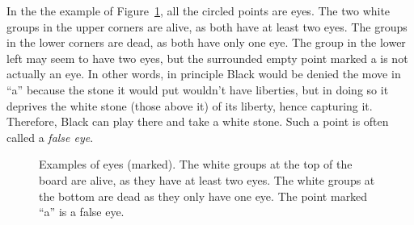 In the the example of Figure~\ref{LifeDeath}, all the circled points are eyes. The two white groups in the upper corners are alive, as both have at least two eyes. The groups in the lower corners are dead, as both have only one eye. The group in the lower left may seem to have two eyes, but the surrounded empty point marked a is not actually an eye. In other words, in principle Black would be denied the move in ``a'' because the stone it would put wouldn't have liberties, but in doing so it deprives the white stone (those above it) of its liberty, hence capturing it. Therefore, Black can play there and take a white stone. Such a point is often called a \emph{false eye}.
\begin{figure}[h!t]
\centering
{}
\caption{Examples of eyes (marked). The white groups at the top of the board are alive, as they have at least two eyes. The white groups at the bottom are dead as they only have one eye. The point marked ``a'' is a false eye.}\label{LifeDeath}
\end{figure}
